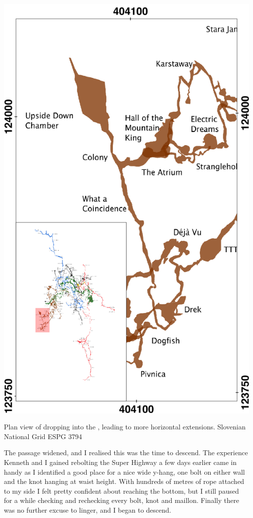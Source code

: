 \begin{marginfigure}
\checkoddpage \ifoddpage \forcerectofloat \else \forceversofloat \fi
\centering
 \includegraphics[width=\linewidth]{images/2016/jack-middle-2016/mountain_king_inset}
 \caption{Plan view of \protect{} dropping into the \protect{}, leading to more horizontal extensions. Slovenian National Grid ESPG 3794}
 \label{Mountain King inset}
\end{marginfigure}
 
The passage widened, and I realised this was the time to descend. The experience Kenneth and I gained rebolting the Super Highway a few days earlier came in handy as I identified a good place for a nice wide y-hang, one bolt on either wall and the knot hanging at waist height. With hundreds of metres of rope attached to my side I felt pretty confident about reaching the bottom, but I still paused for a while checking and rechecking every bolt, knot and maillon. Finally there was no further excuse to linger, and I began to descend.
 
